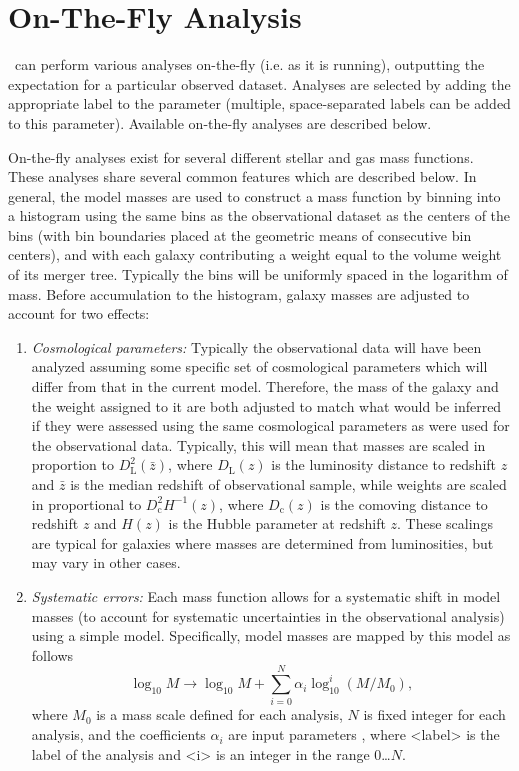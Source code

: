\section{On-The-Fly Analysis}\label{sec:OnTheFlyAnalysis}

\glc\ can perform various analyses on-the-fly (i.e. as it is running), outputting the expectation for a particular observed dataset. Analyses are selected by adding the appropriate label to the {\normalfont \ttfamily [mergerTreeAnalyses]} parameter (multiple, space-separated labels can be added to this parameter). Available on-the-fly analyses are described below.

On-the-fly analyses exist for several different stellar and gas mass functions. These analyses share several common features which are described below. In general, the model masses are used to construct a mass function by binning into a histogram using the same bins as the observational dataset as the centers of the bins (with bin boundaries placed at the geometric means of consecutive bin centers), and with each galaxy contributing a weight equal to the volume weight of its merger tree. Typically the bins will be uniformly spaced in the logarithm of mass. Before accumulation to the histogram, galaxy masses are adjusted to account for two effects:
\begin{enumerate}
\item \emph{Cosmological parameters:} Typically the observational data will have been analyzed assuming some specific set of cosmological parameters which will differ from that in the current model. Therefore, the mass of the galaxy and the weight assigned to it are both adjusted to match what would be inferred if they were assessed using the same cosmological parameters as were used for the observational data. Typically, this will mean that masses are scaled in proportion to $D_\mathrm{L}^2(\bar{z})$, where $D_\mathrm{L}(z)$ is the luminosity distance to redshift $z$ and $\bar{z}$ is the median redshift of observational sample, while weights are scaled in proportional to $D_\mathrm{c}^2 H^{-1}(z)$, where $D_\mathrm{c}(z)$ is the comoving distance to redshift $z$ and $H(z)$ is the Hubble parameter at redshift $z$. These scalings are typical for galaxies where masses are determined from luminosities, but may vary in other cases.
\item \emph{Systematic errors:} Each mass function allows for a systematic shift in model masses (to account for systematic uncertainties in the observational analysis) using a simple model. Specifically, model masses are mapped by this model as follows
\begin{equation}
\log_\mathrm{10} M \rightarrow \log_{10} M + \sum_{i=0}^N \alpha_i \log^i_{10}(M/M_0),
\end{equation}
where $M_0$ is a mass scale defined for each analysis, $N$ is fixed integer for each analysis, and the coefficients $\alpha_i$ are input parameters {\normalfont {}}, where {\normalfont \ttfamily \textless label\textgreater} is the label of the analysis and {\normalfont \ttfamily \textless i\textgreater} is an integer in the range 0\ldots$N$.
\end{enumerate}
